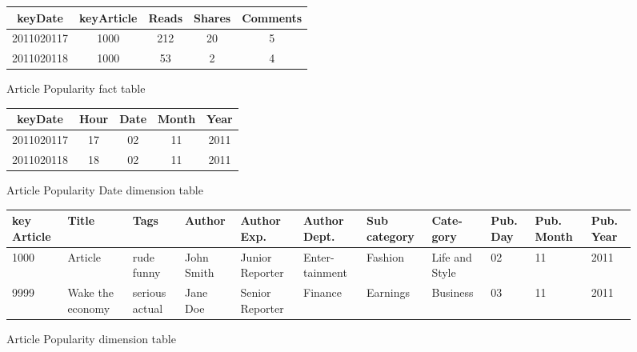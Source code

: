 \begin{figure}[!hbp]
\caption{\label{t:f_artpop}Article Popularity fact table}
\begin{center}
\begin{tabular}{|c|c|c|c|c|}
\hline
keyDate & keyArticle & Reads & Shares & Comments\\
\hline
\hline
2011020117 & 1000 & 212 & 20 & 5\\
2011020118 & 1000 & 53 & 2 & 4\\
\hline
\end{tabular}
\end{center}
\end{figure}

\begin{figure}[!hbp]
\caption{\label{t:art_date}Article Popularity Date dimension table}
\begin{center}
\begin{tabular}{|c|c|c|c|c|}
\hline
keyDate  & Hour & Date & Month & Year\\
\hline
\hline
2011020117 & 17 & 02 & 11 & 2011\\
\hline
2011020118 & 18 & 02 & 11 & 2011\\
\hline
\end{tabular}
\end{center}
\end{figure}


\begin{figure}[!hbp]
\caption{\label{t:art_dim_table}Article Popularity dimension table }
\begin{center}
\begin{tabular}{|p{1cm}|p{1cm}|p{1cm}|p{1.25cm}|p{1.25cm}|p{1.25cm}|p{1.35cm}|p{1.3cm}|p{0.7cm}|p{1.05cm}|p{0.9cm}|}
\hline
key Article & Title & Tags & Author & Author Exp. & Author Dept. & Sub category & Cate- gory & Pub. Day & Pub. Month & Pub. Year\\
\hline
\hline
1000 & Article  & rude funny & John Smith & Junior Reporter & Enter- tainment & Fashion & Life and Style & 02 & 11 & 2011\\
\hline
9999 & Wake the economy & serious actual&Jane Doe & Senior Reporter & Finance & Earnings & Business & 03 & 11 & 2011\\
\hline
\end{tabular}
\end{center}
\end{figure}

\clearpage
